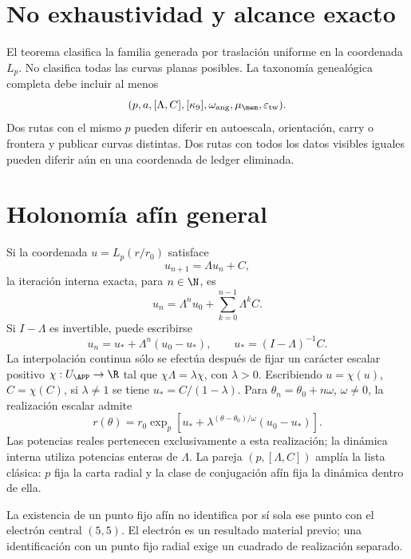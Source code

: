 \section{No exhaustividad y alcance exacto}

El teorema clasifica la familia generada por traslación uniforme en la
coordenada \(L_p\). No clasifica todas las curvas planas posibles. La
taxonomía genealógica completa debe incluir al menos
\[
 (p,a,[\Lambda,C],[\kappa_9],
 \omega_{\mathrm{ang}},\mu_{\mem},\varepsilon_{\mathrm{tw}}).
\]
Dos rutas con el mismo \(p\) pueden diferir en autoescala, orientación,
carry o frontera y publicar curvas distintas. Dos rutas con todos los datos
visibles iguales pueden diferir aún en una coordenada de ledger eliminada.

\section{Holonomía afín general}

Si la coordenada \(u=L_p(r/r_0)\) satisface
\[
 u_{n+1}=\Lambda u_n+C,
\]
la iteración interna exacta, para \(n\in\N\), es
\[
 u_n=\Lambda^n u_0+\sum_{k=0}^{n-1}\Lambda^kC.
\]
Si \(I-\Lambda\) es invertible, puede escribirse
\[
 u_n=u_*+\Lambda^n(u_0-u_*),
 \qquad u_*=(I-\Lambda)^{-1}C.
\]
La interpolación continua sólo se efectúa después de fijar un carácter
escalar positivo \(\chi:U_{\APP}\to\R\) tal que
\(\chi\Lambda=\lambda\chi\), con \(\lambda>0\). Escribiendo
\(u=\chi(u)\), \(C=\chi(C)\), si \(\lambda\neq1\) se tiene
\(u_*=C/(1-\lambda)\). Para \(\theta_n=\theta_0+n\omega\),
\(\omega\neq0\), la realización escalar admite
\begin{equation}
 r(\theta)=r_0\exp_p\!\left[
 u_*+\lambda^{(\theta-\theta_0)/\omega}(u_0-u_*)
 \right].
 \label{espiral:eq:familia-afin-general}
\end{equation}
Las potencias reales pertenecen exclusivamente a esta realización; la
dinámica interna utiliza potencias enteras de \(\Lambda\). La pareja
\((p,[\Lambda,C])\) amplía la lista clásica: \(p\) fija la carta radial y
la clase de conjugación afín fija la dinámica dentro de ella.

\begin{remark}
La existencia de un punto fijo afín no identifica por sí sola ese punto con el
electrón central \((5,5)\). El electrón es un resultado material previo; una
identificación con un punto fijo radial exige un cuadrado de realización
separado.
\end{remark}

